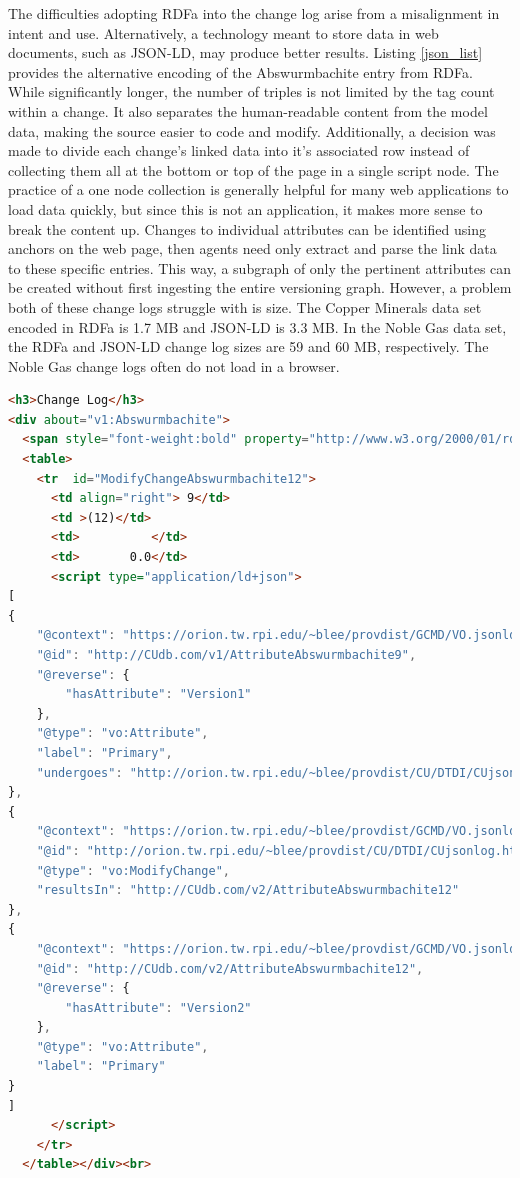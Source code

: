 The difficulties adopting RDFa into the change log arise from a misalignment in intent and use.
Alternatively, a technology meant to store data in web documents, such as JSON-LD, may produce better results.
Listing \ref{json_list} provides the alternative encoding of the Abswurmbachite entry from RDFa.
While significantly longer, the number of triples is not limited by the tag count within a change.
It also separates the human-readable content from the model data, making the source easier to code and modify.
Additionally, a decision was made to divide each change's linked data into it's associated row instead of collecting them all at the bottom or top of the page in a single script node.
The practice of a one node collection is generally helpful for many web applications to load data quickly, but since this is not an application, it makes more sense to break the content up.
Changes to individual attributes can be identified using anchors on the web page, then agents need only extract and parse the link data to these specific entries.
This way, a subgraph of only the pertinent attributes can be created without first ingesting the entire versioning graph.
However, a problem both of these change logs struggle with is size.
The Copper Minerals data set encoded in RDFa is 1.7 MB and JSON-LD is 3.3 MB.
In the Noble Gas data set, the RDFa and JSON-LD change log sizes are 59 and 60 MB, respectively.
The Noble Gas change logs often do not load in a browser.

\begin{lstlisting}[language=HTML, caption=Abswurmbachite JSON-LD, label=json_list]
<h3>Change Log</h3>
<div about="v1:Abswurmbachite">
  <span style="font-weight:bold" property="http://www.w3.org/2000/01/rdf-schema#label">Abswurmbachite</span>
  <table>
    <tr  id="ModifyChangeAbswurmbachite12">
      <td align="right"> 9</td>
      <td >(12)</td>
      <td>          </td>
      <td>       0.0</td>
      <script type="application/ld+json">
[
{
	"@context": "https://orion.tw.rpi.edu/~blee/provdist/GCMD/VO.jsonld", 
	"@id": "http://CUdb.com/v1/AttributeAbswurmbachite9", 
	"@reverse": {
		"hasAttribute": "Version1"
	}, 
	"@type": "vo:Attribute", 
	"label": "Primary", 
	"undergoes": "http://orion.tw.rpi.edu/~blee/provdist/CU/DTDI/CUjsonlog.html#ModifyChangeAbswurmbachite12"
}, 
{
	"@context": "https://orion.tw.rpi.edu/~blee/provdist/GCMD/VO.jsonld", 
	"@id": "http://orion.tw.rpi.edu/~blee/provdist/CU/DTDI/CUjsonlog.html#ModifyChangeAbswurmbachite12", 
	"@type": "vo:ModifyChange", 
	"resultsIn": "http://CUdb.com/v2/AttributeAbswurmbachite12"
}, 
{
	"@context": "https://orion.tw.rpi.edu/~blee/provdist/GCMD/VO.jsonld", 
	"@id": "http://CUdb.com/v2/AttributeAbswurmbachite12", 
	"@reverse": {
		"hasAttribute": "Version2"
	}, 
	"@type": "vo:Attribute", 
	"label": "Primary"
}
]
      </script>
    </tr>
  </table></div><br>
\end{lstlisting}

